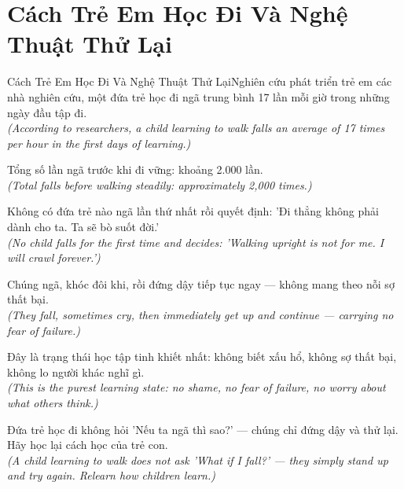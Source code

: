 \section{Cách Trẻ Em Học Đi Và Nghệ Thuật Thử Lại}
\begin{truyen}{Cách Trẻ Em Học Đi Và Nghệ Thuật Thử Lại}{Nghiên cứu phát triển trẻ em}
 các nhà nghiên cứu, một đứa trẻ học đi ngã trung bình 17 lần mỗi giờ trong những ngày đầu tập đi.\\[4pt]
\textit{(According to researchers, a child learning to walk falls an average of 17 times per hour in the first days of learning.)}

Tổng số lần ngã trước khi đi vững: khoảng 2.000 lần.\\[4pt]
\textit{(Total falls before walking steadily: approximately 2,000 times.)}

Không có đứa trẻ nào ngã lần thứ nhất rồi quyết định: 'Đi thẳng không phải dành cho ta. Ta sẽ bò suốt đời.'\\[4pt]
\textit{(No child falls for the first time and decides: 'Walking upright is not for me. I will crawl forever.')}

Chúng ngã, khóc đôi khi, rồi đứng dậy tiếp tục ngay --- không mang theo nỗi sợ thất bại.\\[4pt]
\textit{(They fall, sometimes cry, then immediately get up and continue --- carrying no fear of failure.)}

Đây là trạng thái học tập tinh khiết nhất: không biết xấu hổ, không sợ thất bại, không lo người khác nghĩ gì.\\[4pt]
\textit{(This is the purest learning state: no shame, no fear of failure, no worry about what others think.)}

\end{truyen}
\begin{baihoc}
  Đứa trẻ học đi không hỏi 'Nếu ta ngã thì sao?' --- chúng chỉ đứng dậy và thử lại. Hãy học lại cách học của trẻ con.\\[4pt]
  \textit{(A child learning to walk does not ask 'What if I fall?' --- they simply stand up and try again. Relearn how children learn.)}
\end{baihoc}

